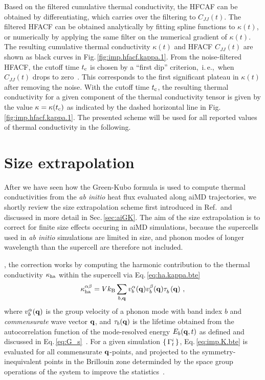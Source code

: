 Based on the filtered cumulative thermal conductivity, the HFCAF can be obtained by differentiating, which carries over the filtering to $C_{JJ} (t)$. The filtered HFACF can be obtained analytically by fitting spline functions to $\kappa (t)$, or numerically by applying the same filter on the numerical gradient of $\kappa (t)$. The resulting cumulative thermal conductivity $\kappa (t)$ and HFACF $C_{JJ} (t)$ are shown as black curves in Fig.\,\ref{fig:imp.hfacf.kappa.1}. From the noise-filtered HFACF, the cutoff time $t_{\rm c}$ is chosen by a ``first dip'' criterion,~i.\,e.,~when $C_{JJ} (t)$ drops to zero~. This corresponds to the first significant plateau in $\kappa (t)$ after removing the noise. With the cutoff time $t_{\rm c}$, the resulting thermal conductivity for a given component of the thermal conductivity tensor is given by the value $\kappa = \kappa (t_{\rm c})$ as indicated by the dashed horizontal line in Fig.\,\ref{fig:imp.hfacf.kappa.1}.
The presented scheme will be used for all reported values of thermal conductivity in the following.

\section{Size extrapolation}
\label{sec:imp.extrapolation}

After we have seen how the Green-Kubo formula is used to compute thermal conductivities from the \emph{ab initio} heat flux evaluated along aiMD trajectories, we shortly review the size extrapolation scheme first introduced in Ref.\,\cite{Carbogno2016} and discussed in more detail in Sec.\,\ref{sec:aiGK}. The aim of the size extrapolation is to correct for finite size effects occuring in aiMD simulations, because the supercells used in \emph{ab initio} simulations are limited in size, and phonon modes of longer wavelength than the supercell are therefore not included. 

, the correction works by computing the harmonic contribution to the thermal conductivity $\kappa_{\rm ha}$ within the supercell via Eq.\,\eqref{eq:ha.kappa.bte}
\begin{align}
	\kappa_{\rm ha}^{\alpha \beta} = V k_{\rm B} \sum_{b, {\bf q}} v^\alpha_b ({\bf q}) v^{\beta}_b ({\bf q}) \fD \tau_b ({\bf q})~,
	\label{eq:imp.K.bte}
\end{align}
where $v_b^\alpha ({\bf q})$ is the group velocity of a phonon mode with band index $b$ and \emph{commensurate} wave vector $\bf q$, and $\tau_b ({\bf q})$ is the lifetime obtained from the autocorrelation function of the mode-resolved energy $E_b ({\bf q}, t)$ as defined and discussed in Eq.\,\eqref{eq:G_s}~\cite{Carbogno2016}. For a given simulation $\set{\Gamma^i  _t}$, Eq.\,\eqref{eq:imp.K.bte} is evaluated for all commensurate $\bf q$-points, and projected to the symmetry-inequivalent points in the Brillouin zone determinded by the space group operations of the system to improve the statistics~\cite{Maradudin1968,Spglib}.

